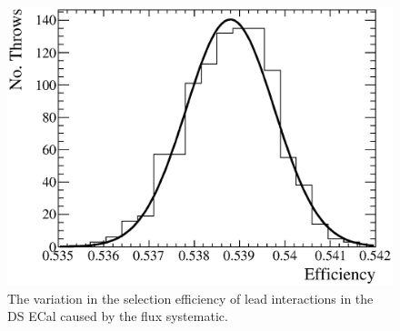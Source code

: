 \begin{figure}
  \centering
  \includegraphics[width=12cm]{images/measurement/systematics/flux/flux_efficiency_variation.eps}
  \caption{The variation in the selection efficiency of lead interactions in the DS ECal caused by the flux systematic.}
  \label{fig:FluxEfficiencyVariation}
\end{figure}
